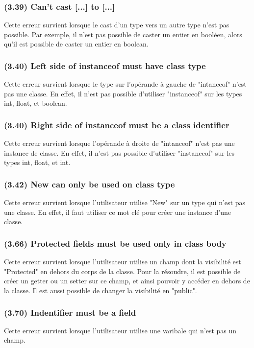 \documentclass[12pt, a4paper, one side]{article}
\begin{document}
    \subsubsection{(3.39) Can't cast [...] to [...]}
    Cette erreur survient lorsque le cast d'un type vers un autre type n'est pas possible. Par exemple, il n'est pas possible de caster un entier en booléen, alors qu'il est possible de caster un entier en boolean.

    \subsubsection{(3.40) Left side of instanceof must have class type}
    Cette erreur survient lorsque le type sur l'opérande à gauche de "intanceof" n'est pas une classe. En effet, il n'est pas possible d'utiliser "instanceof" sur les types int, float, et boolean.

    \subsubsection{(3.40) Right side of instanceof must be a class identifier}
    Cette erreur survient lorsque l'opérande à droite de "intanceof" n'est pas une instance de classe. En effet, il n'est pas possible d'utiliser "instanceof" sur les types int, float, et int.

    \subsubsection{(3.42) New can only be used on class type}
    Cette erreur survient lorsque l'utilisateur utilise "New" sur un type qui n'est pas une classe. En effet, il faut utiliser ce mot clé pour créer une instance d'une classe.

    \subsubsection{(3.66) Protected fields must be used only in class body}
    Cette erreur survient lorsque l'utilisateur utilise un champ dont la visibilité est "Protected" en dehors du corps de la classe. Pour la résoudre, il est possible de créer un getter ou un setter sur ce champ, et ainsi pouvoir y accéder en dehors de la classe. Il est aussi possible de changer la visibilité en "public".

    \subsubsection{(3.70) Indentifier must be a field}
    Cette erreur survient lorsque l'utilisateur utilise une varibale qui n'est pas un champ.
\end{document}
